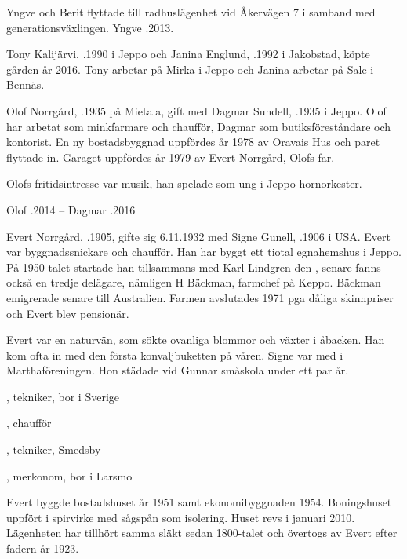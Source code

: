 Yngve och Berit flyttade till radhuslägenhet vid Åkervägen 7 i samband med generationsväxlingen.
Yngve .2013.




Tony Kalijärvi, .1990 i Jeppo och Janina Englund, .1992 i Jakobstad, köpte gården år 2016. Tony arbetar på Mirka i Jeppo och Janina arbetar på Sale i Bennäs.


Olof Norrgård, .1935 på Mietala, gift med Dagmar Sundell, .1935  i Jeppo. Olof har arbetat som minkfarmare och chaufför, Dagmar som butiksföreståndare och kontorist. En ny bostadsbyggnad uppfördes år 1978 av Oravais Hus och paret flyttade in. Garaget uppfördes år 1979 av Evert Norrgård, Olofs far.

Olofs fritidsintresse var musik, han spelade som ung i Jeppo hornorkester.

Olof .2014  --  Dagmar .2016




Evert Norrgård, .1905, gifte sig 6.11.1932 med Signe Gunell, .1906 i USA. Evert var byggnadssnickare och chaufför. Han har byggt ett tiotal egnahemshus i Jeppo. På 1950-talet startade han tillsammans med Karl Lindgren den , senare fanns också en tredje delägare, nämligen H Bäckman, farmchef på Keppo. Bäckman emigrerade senare till Australien. Farmen avslutades 1971 pga dåliga skinnpriser och Evert blev pensionär.

Evert var en naturvän, som sökte ovanliga blommor och växter i åbacken. Han kom ofta in med den första konvaljbuketten på våren. Signe var med i Marthaföreningen. Hon städade vid Gunnar småskola under ett par år.
\begin{jhchildren}
  \item {}, tekniker, bor i Sverige
  \item {}, chaufför
  \item {}, tekniker, Smedsby
  \item {}, merkonom, bor i Larsmo
\end{jhchildren}
Evert byggde bostadshuset år 1951 samt ekonomibyggnaden 1954. Boningshuset uppfört i spirvirke med sågspån som isolering. Huset revs i januari 2010. Lägenheten har tillhört samma släkt sedan 1800-talet och övertogs av Evert efter fadern år 1923.

